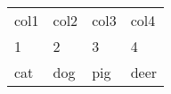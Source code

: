 \documentclass{article}
\begin{document}
\begin{table}[!htbp] 
\centering 
\small 
\begin{tabular}{|l|l|l|l|} 
\hline 
col1 & col2 & col3 & col4 \\ 
1 & 2 & 3 & 4 \\ 
cat & dog & pig & deer \\ 
\hline \end{tabular} 
\end{table}
\end{document}
